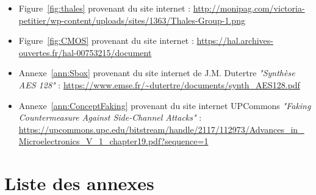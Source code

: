 \documentclass[oneside]{book}
\makeatletter
\newcommand{\dummy@addcontentsline}[3]{}
\newcommand{\DeactivateToc}{\let\addcontentsline\dummy@addcontentsline}
\makeatother
\begin{document}
\begin{itemize}

\item Figure~\ref{fig:thales} provenant du site internet :
\url{http://monipag.com/victoria-petitier/wp-content/uploads/sites/1363/Thales-Group-1.png}

\item Figure~\ref{fig:CMOS} provenant du site internet :
\url{https://hal.archives-ouvertes.fr/hal-00753215/document}

\item Annexe~\ref{ann:Sbox} provenant du site internet de J.M. Dutertre \textit{"Synthèse AES 128"} :
\url{https://www.emse.fr/~dutertre/documents/synth_AES128.pdf}

\item Annexe~\ref{ann:ConceptFaking} provenant du site internet UPCommons \textit{"Faking Countermeasure Against Side-Channel Attacks"} :
\url{https://upcommons.upc.edu/bitstream/handle/2117/112973/Advances_in_Microelectronics_V_1_chapter19.pdf?sequence=1}

\end{itemize}


{}

\nocite{*}




\newpage

\section*{Liste des annexes}
\appendix
\DeactivateToc
\end{document}
